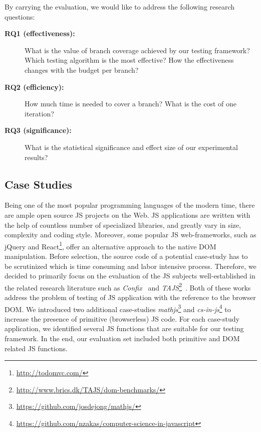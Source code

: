 \documentclass[sigconf,review,anonymous]{acmart}
\begin{document}
By carrying the evaluation, we would like to address the following research questions:
\begin{description}
\item[\textbf{RQ1 (effectiveness):}] What is the value of branch coverage achieved by our testing framework? Which testing algorithm is the most effective? How the effectiveness changes with the budget per branch?
\item[\textbf{RQ2 (efficiency):}] How much time is needed to cover a branch? What is the cost of one iteration?
\item[\textbf{RQ3 (significance):}] What is the statistical significance and effect size of our experimental results? 
\end{description}


\subsection{Case Studies}
\label{sub.sec.case.studies}

Being one of the most popular programming languages of the modern time, there are ample open source JS projects on the Web. JS applications are written with the help of countless number of specialized libraries, and greatly vary in size, complexity and coding style. Moreover, some popular JS web-frameworks, such as jQuery and React\footnote{\url{http://todomvc.com/}}, offer an alternative approach to the native DOM manipulation. Before selection, the source code of a potential case-study has to be scrutinized which is time consuming and labor intensive process. Therefore, we decided to primarily focus on the evaluation of the JS subjects well-established in the related research literature such as \emph{Confix}~\cite{amin:ase15} and \emph{TAJS}\footnote{\url{http://www.brics.dk/TAJS/dom-benchmarks/}}~\cite{dom2011}. Both of these works address the problem of testing of JS application with the reference to the browser DOM. We introduced two additional case-studies \emph{mathjs}\footnote{\url{https://github.com/josdejong/mathjs/}} and \emph{cs-in-js}\footnote{\url{https://github.com/nzakas/computer-science-in-javascript}} to increase the presence of primitive (browserless) JS code. For each case-study application, we identified several JS functions that are suitable for our testing framework. In the end, our evaluation set included both primitive and DOM related JS functions.
\end{document}
